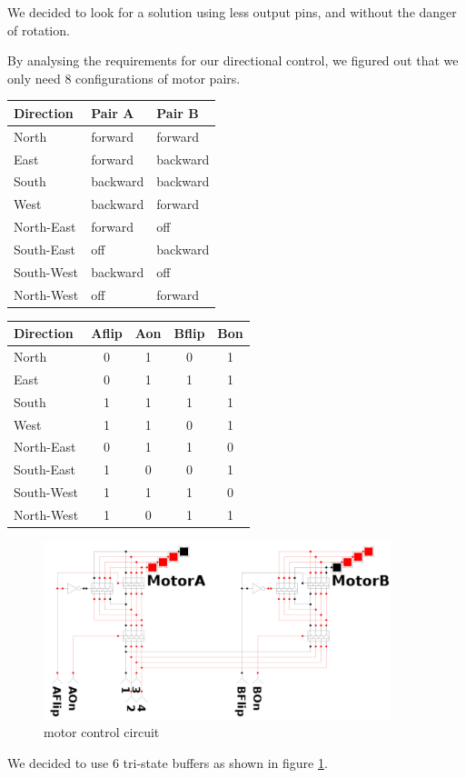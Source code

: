 We decided to look for a solution using less output pins,
and without the danger of rotation.

By analysing the requirements for our directional control,
we figured out that we only need 8 configurations of motor pairs.
\begin{center}
\begin{tabular}{|l|l|l|}
	\hline
	Direction & Pair A & Pair B	\\
	\hline
	North & forward & forward \\
	East 	& forward & backward \\
	South & backward & backward \\
	West 	& backward & forward \\
	\hline
	North-East & forward & off \\
	South-East & off & backward \\
	South-West & backward & off\\
	North-West & off & forward \\
	\hline
\end{tabular}
\begin{tabular}{|l|c|c|c|c|}
	\hline
	Direction & Aflip & Aon & Bflip & Bon \\
	\hline
	North & 0 & 1 & 0 & 1 \\
	East 	& 0 & 1 & 1 & 1 \\
	South & 1 & 1 & 1 & 1 \\
	West 	& 1 & 1 & 0 & 1 \\
	\hline
	North-East & 0 & 1 & 1 & 0 \\
	South-East & 1 & 0 & 0 & 1 \\
	South-West & 1 & 1 & 1 & 0 \\
	North-West & 1 & 0 & 1 & 1 \\
	\hline
\end{tabular}
\end{center}
\newpage

\begin{figure}[htp]
	\centering
	\includegraphics[width=0.9\textwidth]{figures/move/direction_choice}
	\caption{motor control circuit}
	\label{fig:mot_ctrl}
\end{figure}

We decided to use 6 tri-state buffers as shown in figure \ref{fig:mot_ctrl}.
